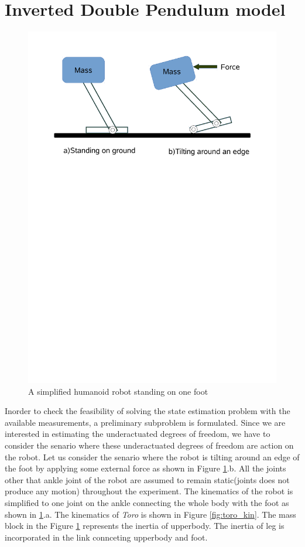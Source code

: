\section{Inverted Double Pendulum model} 
\begin{figure}[H]
	\centering
	\includegraphics[trim = 0mm 180mm 0mm 10mm, scale=0.50]{Bilder/simp_uactcase.pdf}
	\caption{A simplified humanoid robot standing on one foot}
	\label{fig:idp_scene}
\end{figure}
Inorder to check the feasibility of solving the state estimation problem with the available measurements, a preliminary subproblem is formulated. Since we are interested in estimating the underactuated degrees of freedom, we have to consider the senario where these underactuated degrees of freedom are action on the robot. Let us consider the senario where the robot is tilting around an edge of the foot by applying some external force as shown in Figure \ref{fig:idp_scene}.b. All the joints other that ankle joint of the robot are assumed to remain static(joints does not produce any motion) throughout the experiment. The kinematics of the robot is simplified to one joint on the ankle connecting the whole body with the foot as shown in \ref{fig:idp_scene}.a. The kinematics of \emph{Toro} is shown in Figure \ref{fig:toro_kin}. The mass block in the Figure \ref{fig:idp_scene} represents the inertia of upperbody. The inertia of leg is incorporated in the link connceting upperbody and foot. 

